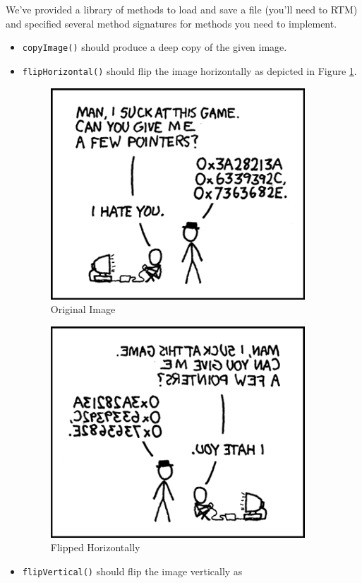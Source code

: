 \documentclass[12pt]{scrartcl}
\begin{document}
We've provided a library of methods to load and save a file (you'll need to 
RTM) and specified several method signatures for methods you need to
implement.  
\begin{itemize}
  \item \texttt{copyImage()} should produce a deep copy of the given
  image.
  \item \texttt{flipHorizontal()} should flip the image horizontally
  as depicted in Figure \ref{image:pointersHFlip}.
  
  \begin{figure}[h]  
  \centering
  \includegraphics[scale=.50]{hack7.0-files/pointers.png}
  \caption{Original Image}
  \end{figure}
  \begin{figure}[h]  
  \centering
  \includegraphics[scale=.50]{hack7.0-files/pointersHFlip}
  \caption{Flipped Horizontally}
  \label{image:pointersHFlip}
  \end{figure}
  \item \texttt{flipVertical()} should flip the image vertically as

\end{itemize}
\end{document}
